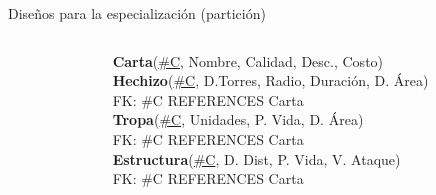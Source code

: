 \begin{frame}{Dise\~nos para la especializaci\'on (partici\'on)}
\begin{columns}[T]
\begin{column}{0.48\linewidth}
        \end{column}

        \begin{column}{0.48\linewidth}
            \vspace{12mm}
            \begin{scriptsize}
                
                \textbf{Carta}(\underline{\#C}, Nombre, Calidad, Desc., Costo)\\[2mm]
                \textbf{Hechizo}(\underline{\#C}, D.Torres, Radio, Duraci\'on, D. \'Area)\\[1mm]
                \hspace{4mm} FK: \#C REFERENCES Carta \\[2mm]
                \textbf{Tropa}(\underline{\#C}, Unidades, P. Vida, D. \'Area)\\[1mm]
                \hspace{4mm} FK: \#C REFERENCES Carta \\[2mm]
                
                \textbf{Estructura}(\underline{\#C}, D. Dist, P. Vida, V. Ataque)\\[1mm]
                \hspace{4mm} FK: \#C REFERENCES Carta\\[2mm]
            \end{scriptsize}
        \end{column}
        
    \end{columns}


\end{frame}


